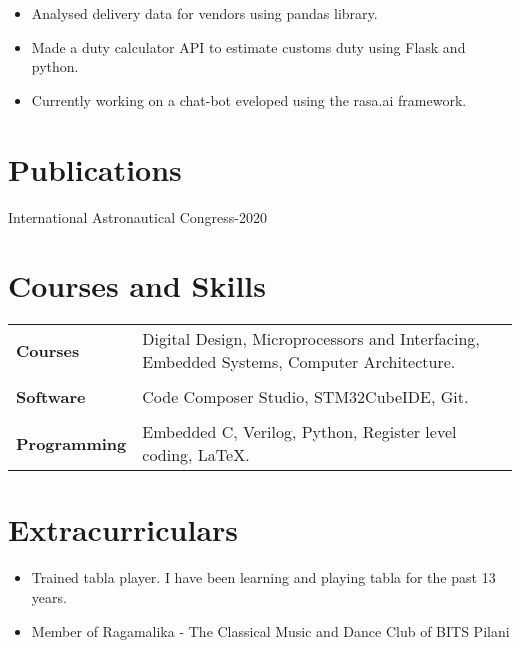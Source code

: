 \documentclass{resume}
\begin{document}
\begin{itemize}\setlength{\itemsep}{0pt}\setlength{\parskip}{0pt}\vspace{-0.5em}
    \item Analysed delivery data for vendors using pandas library.
    \item Made a duty calculator API to estimate customs duty using Flask and python.
    \item Currently working on a chat-bot eveloped using the rasa.ai framework.
\end{itemize}

\vspace{-0.5cm}
\section{Publications}
 { International Astronautical Congress-2020}
\section{Courses and Skills}
\vspace{-0.5cm}
\begin{table}[!htb]
    \begin{tabular}{l|l}
    \textbf{Courses}        &   Digital Design, Microprocessors and Interfacing, Embedded Systems, Computer Architecture. \\
                            &   \\
    \textbf{Software}       &   Code Composer Studio, STM32CubeIDE, Git.\\
                            &   \\
    \textbf{Programming}    &   Embedded C, Verilog, Python, Register level coding, \LaTeX.\\
    \end{tabular}
\end{table}
\vspace{-0.5cm}
\section{Extracurriculars}
\begin{itemize}\setlength{\itemsep}{0pt}\setlength{\parskip}{0pt}\vspace{-0.5em}
    \item Trained tabla player. I have been learning and playing tabla for the past 13 years.
    \item Member of Ragamalika - The Classical Music and Dance Club of BITS Pilani 
\end{itemize}
\end{document}

